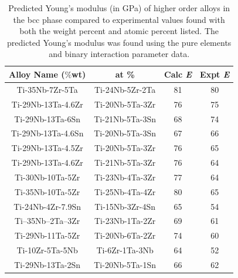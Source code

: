 \newpage
\begin{table}[H]
	\caption{Predicted Young's modulus (in GPa) of higher order alloys in the bcc phase compared to experimental values found with both the weight percent and atomic percent listed. The predicted Young's modulus was found using the pure elements and binary interaction parameter data.}
	\centering
	\begin{tabular}{ c c c c }
		\hline
		Alloy Name ($\%$wt) & at \% & Calc \textit{E} & Expt \textit{E}\\
		\hline
		Ti-35Nb-7Zr-5Ta \cite{Geetha2009} & Ti-24Nb-5Zr-2Ta & 81 & 80\\
		Ti-29Nb-13Ta-4.6Zr \cite{Geetha2009}  & Ti-20Nb-5Ta-3Zr & 76 & 75\\
		Ti-29Nb-13Ta-6Sn \cite{Geetha2009} & Ti-21Nb-5Ta-3Sn & 68 & 74\\
		Ti-29Nb-13Ta-4.6Sn \cite{Geetha2009} & Ti-20Nb-5Ta-3Sn & 67 & 66\\
		Ti-29Nb-13Ta-4.5Zr \cite{Geetha2009} & Ti-20Nb-5Ta-3Zr & 76 & 65\\
		Ti-29Nb-13Ta-4.6Zr \cite{Tane2010a} & Ti-21Nb-5Ta-3Zr & 76 & 64\\
		Ti-30Nb-10Ta-5Zr \cite{Tane2010a} & Ti-23Nb-4Ta-3Zr & 77 & 64\\
		Ti-35Nb-10Ta-5Zr \cite{Tane2010a} & Ti-25Nb-4Ta-4Zr & 80 & 65\\
		Ti-24Nb-4Zr-7.9Sn \cite{Mohammed2014} & Ti-15Nb-3Zr-4Sn & 65 & 54\\
		Ti–35Nb–2Ta–3Zr \cite{Mohammed2014} & Ti-23Nb-1Ta-2Zr & 69 & 61\\
		Ti-29Nb-11Ta-5Zr \cite{Mohammed2014} & Ti-20Nb-6Ta-2Zr & 74 & 60\\
		Ti-10Zr-5Ta-5Nb \cite{Mohammed2014} & Ti-6Zr-1Ta-3Nb & 64 & 52\\
		Ti-29Nb-13Ta-2Sn \cite{Mohammed2014} & Ti-20Nb-5Ta-1Sn & 66 & 62\\
		\hline
	\end{tabular}
	\label{Ch5-table:tixdatacomp}
\end{table}
\clearpage

